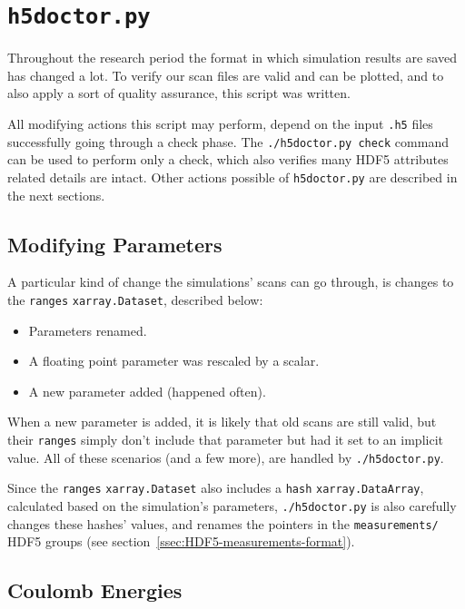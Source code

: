 \section{\texttt{h5doctor.py}}

Throughout the research period the format in which simulation results are saved has changed a lot. To verify our scan files are valid and can be plotted, and to also apply a sort of quality assurance, this script was written.

All modifying actions this script may perform, depend on the input \texttt{.h5} files successfully going through a check phase. The \texttt{./h5doctor.py check} command can be used to perform only a check, which also verifies many HDF5 attributes related details are intact. Other actions possible of \texttt{h5doctor.py} are described in the next sections. 

\subsection{Modifying Parameters}

A particular kind of change the simulations' scans can go through, is changes to the \texttt{ranges} \texttt{xarray.Dataset}, described below:

\begin{itemize}
	\item Parameters renamed.
	\item A floating point parameter was rescaled by a scalar.
	\item A new parameter added (happened often).
\end{itemize}

When a new parameter is added, it is likely that old scans are still valid, but their \texttt{ranges} simply don't include that parameter but had it set to an implicit value. All of these scenarios (and a few more), are handled by \texttt{./h5doctor.py}.

Since the \texttt{ranges} \texttt{xarray.Dataset} also includes a \texttt{hash} \texttt{xarray.DataArray}, calculated based on the simulation's parameters,  \texttt{./h5doctor.py} is also carefully changes these hashes' values, and renames the pointers in the \texttt{measurements/} HDF5 groups (see section~\ref{ssec:HDF5-measurements-format}).

\subsection{Coulomb Energies}\label{ssec:h5doctor_coulomb}

